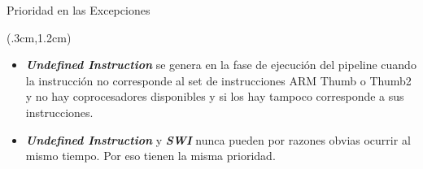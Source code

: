 \documentclass[table,x11names,aspectratio=169]{beamer}
\begin{document}
\begin{frame}{Prioridad en las Excepciones}
 \begin{textblock*}{\textwidth}(.3cm,1.2cm)
  \begin{itemize}[<+->] \justifying \parskip 0.3cm
   \item \textbf{\textit{Undefined Instruction}} se genera en la fase de ejecución del pipeline cuando la instrucción no corresponde al set de instrucciones ARM Thumb o Thumb2 y no hay coprocesadores disponibles y si los hay tampoco corresponde a sus instrucciones.
   \item \textbf{\textit{Undefined Instruction}} y \textbf{\textit{SWI}} nunca pueden por razones obvias ocurrir al mismo tiempo. Por eso tienen la misma prioridad.
  \end{itemize}
 \end{textblock*}
\end{frame}
\end{document}
